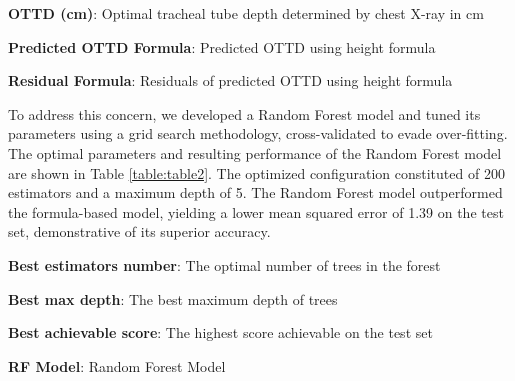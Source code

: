 \documentclass[11pt]{article}
\begin{document}
\begin{table}[h]
\caption{Summary statistics for observed and predicted OTTDs with height formula-based model}
\label{table:table1}
\begin{threeparttable}
\renewcommand{\TPTminimum}{\linewidth}
\begin{tablenotes}
\footnotesize
\item \textbf{OTTD (cm)}: Optimal tracheal tube depth determined by chest X-ray in cm
\item \textbf{Predicted OTTD Formula}: Predicted OTTD using height formula
\item \textbf{Residual Formula}: Residuals of predicted OTTD using height formula
\end{tablenotes}
\end{threeparttable}
\end{table}


To address this concern, we developed a Random Forest model and tuned its parameters using a grid search methodology, cross-validated to evade over-fitting. The optimal parameters and resulting performance of the Random Forest model are shown in Table \ref{table:table2}. The optimized configuration constituted of 200 estimators and a maximum depth of 5. The Random Forest model outperformed the formula-based model, yielding a lower mean squared error of 1.39 on the test set, demonstrative of its superior accuracy.

\begin{table}[h]
\caption{Optimal parameters and performance of the Random Forest model}
\label{table:table2}
\begin{threeparttable}
\renewcommand{\TPTminimum}{\linewidth}
\begin{tablenotes}
\footnotesize
\item \textbf{Best estimators number}: The optimal number of trees in the forest
\item \textbf{Best max depth}: The best maximum depth of trees
\item \textbf{Best achievable score}: The highest score achievable on the test set
\item \textbf{RF Model}: Random Forest Model
\end{tablenotes}
\end{threeparttable}
\end{table}
\end{document}

